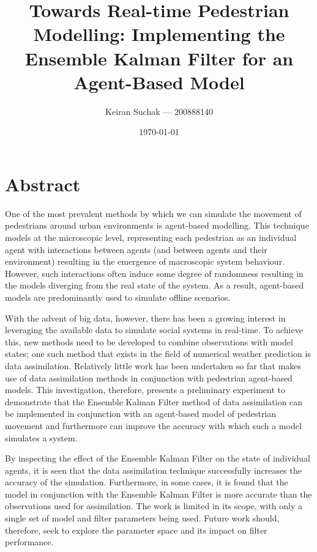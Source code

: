 \documentclass[11pt, twoside, a4paper]{report}
\begin{document}

\cleardoublepage

\title{Towards Real-time Pedestrian Modelling: Implementing the Ensemble Kalman
Filter for an Agent-Based Model}
\author{Keiran Suchak --- 200888140}
\date{\today}


\chapter*{\centering Abstract}

One of the most prevalent methods by which we can simulate the movement of
pedestrians around urban environments is agent-based modelling.
This technique models at the microscopic level, representing each pedestrian as
an individual agent with interactions between agents (and between agents and
their environment) resulting in the emergence of macroscopic system behaviour.
However, such interactions often induce some degree of randomness resulting in
the models diverging from the real state of the system.
As a result, agent-based models are predominantly used to simulate offline
scenarios.

With the advent of big data, however, there has been a growing interest in
leveraging the available data to simulate social systems in real-time.
To achieve this, new methods need to be developed to combine observations with
model states; one such method that exists in the field of numerical weather
prediction is data assimilation.
Relatively little work has been undertaken so far that makes use of data
assimilation methods in conjunction with pedestrian agent-based models.
This investigation, therefore, presents a preliminary experiment to demonstrate
that the Ensemble Kalman Filter method of data assimilation can be implemented
in conjunction with an agent-based model of pedestrian movement and furthermore
can improve the accuracy with which such a model simulates a system.

By inspecting the effect of the Ensemble Kalman Filter on the state of
individual agents, it is seen that the data assimilation technique successfully
increases the accuracy of the simulation.
Furthermore, in some cases, it is found that the model in conjunction with the
Ensemble Kalman Filter is more accurate than the observations used for
assimilation.
The work is limited in its scope, with only a single set of model and filter
parameters being used.
Future work should, therefore, seek to explore the parameter space and its
impact on filter performance.
\end{document}
